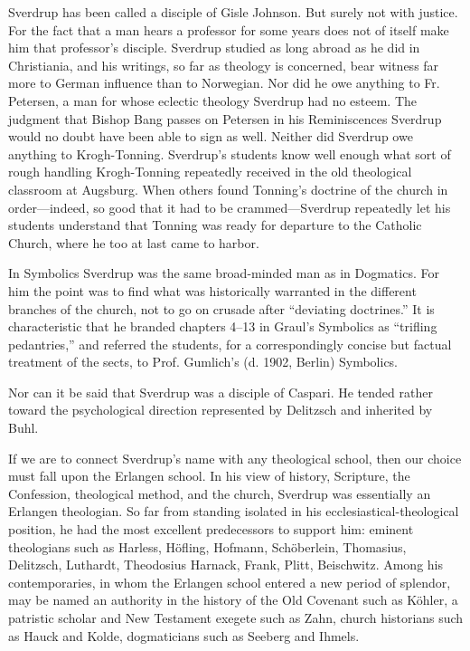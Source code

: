 Sverdrup has been called a disciple of Gisle Johnson. But surely not with justice. For the fact that a man hears a professor for some years does not of itself make him that professor’s disciple. Sverdrup studied as long abroad as he did in Christiania, and his writings, so far as theology is concerned, bear witness far more to German influence than to Norwegian. Nor did he owe anything to Fr. Petersen, a man for whose eclectic theology Sverdrup had no esteem. The judgment that Bishop Bang passes on Petersen in his Reminiscences Sverdrup would no doubt have been able to sign as well. Neither did Sverdrup owe anything to Krogh-Tonning. Sverdrup’s students know well enough what sort of rough handling Krogh-Tonning repeatedly received in the old theological classroom at Augsburg. When others found Tonning’s doctrine of the church in order—indeed, so good that it had to be crammed—Sverdrup repeatedly let his students understand that Tonning was ready for departure to the Catholic Church, where he too at last came to harbor.

In Symbolics Sverdrup was the same broad-minded man as in Dogmatics. For him the point was to find what was historically warranted in the different branches of the church, not to go on crusade after “deviating doctrines.” It is characteristic that he branded chapters 4–13 in Graul’s Symbolics as “trifling pedantries,” and referred the students, for a correspondingly concise but factual treatment of the sects, to Prof. Gumlich’s (d. 1902, Berlin) Symbolics.

Nor can it be said that Sverdrup was a disciple of Caspari. He tended rather toward the psychological direction represented by Delitzsch and inherited by Buhl.

If we are to connect Sverdrup’s name with any theological school, then our choice must fall upon the Erlangen school. In his view of history, Scripture, the Confession, theological method, and the church, Sverdrup was essentially an Erlangen theologian. So far from standing isolated in his ecclesiastical-theological position, he had the most excellent predecessors to support him: eminent theologians such as Harless, Höfling, Hofmann, Schöberlein, Thomasius, Delitzsch, Luthardt, Theodosius Harnack, Frank, Plitt, Beischwitz. Among his contemporaries, in whom the Erlangen school entered a new period of splendor, may be named an authority in the history of the Old Covenant such as Köhler, a patristic scholar and New Testament exegete such as Zahn, church historians such as Hauck and Kolde, dogmaticians such as Seeberg and Ihmels.

